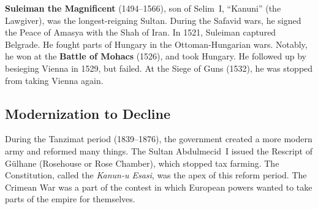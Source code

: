 \textbf{Suleiman the Magnificent} (1494--1566), son of Selim~I, ``Kanuni'' (the Lawgiver),
was the longest-reigning Sultan.
During the Safavid wars, he signed the Peace of Amasya with the Shah of Iran.
In 1521, Suleiman captured Belgrade.
He fought parts of Hungary in the Ottoman-Hungarian wars.
Notably, he won at the \textbf{Battle of Mohacs} (1526), and took Hungary.
He followed up by besieging Vienna in 1529, but failed.
At the Siege of Guns (1532), he was stopped from taking Vienna again.

\subsection*{Modernization to Decline}

During the Tanzimat period (1839--1876), the government created a more modern army and reformed many things.
The Sultan Abdulmecid~I issued the Rescript of G\"ulhane (Rosehouse or Rose Chamber), which stopped tax farming.
The Constitution, called the \textit{Kanun-u Esasi}, was the apex of this reform period.
The Crimean War was a part of the contest in which European powers wanted to take parts of the empire for themselves.
